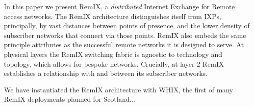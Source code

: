 In this paper we present RemIX, a \emph{distributed} Internet Exchange for
Remote access networks. The RemIX architecture distinguishes itself from IXPs,
principally, by vast distances between points of presence, and the lower density
of subscriber networks that connect via those points. RemIX also embeds the same
principle attributes as the successful remote networks it is designed to serve.
At physical layers the RemIX switching fabric is agnostic to technology and
topology, which allows for bespoke networks. Crucially, at layer-2 RemIX
establishes a relationship with and between its subscriber networks.

We have instantiated the RemIX architecture with WHIX, the first of many RemIX deployments planned for Scotland...



